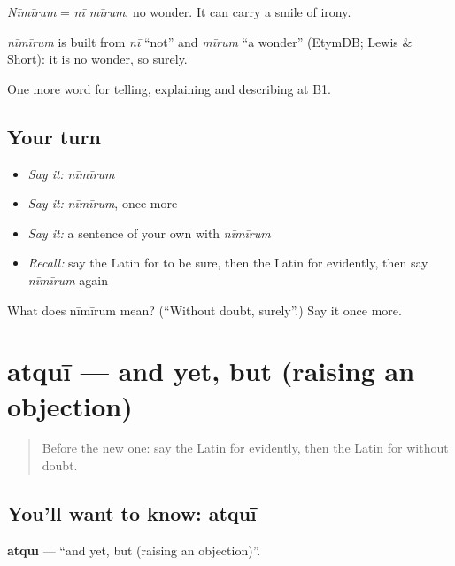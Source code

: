 \emph{Nīmīrum} = \emph{nī mīrum}, no wonder. It can carry a smile of irony.

\begin{cousinweb}
\emph{nīmīrum} is built from \emph{nī} \textquotedblleft{}not\textquotedblright{} and \emph{mīrum} \textquotedblleft{}a wonder\textquotedblright{} (EtymDB; Lewis \& Short): it is no wonder, so surely.
\end{cousinweb}

\begin{grammarlens}[title={What you've built}]
One more word for telling, explaining and describing at B1.
\end{grammarlens}

\subsection*{Your turn}
\begin{itemize}
\raggedright
  \item \emph{Say it:} \emph{nīmīrum}
  \item \emph{Say it:} \emph{nīmīrum}, once more
  \item \emph{Say it:} a sentence of your own with \emph{nīmīrum}
  \item \emph{Recall:} say the Latin for to be sure, then the Latin for evidently, then say \emph{nīmīrum} again
\end{itemize}

\begin{tcolorbox}[breakable,colback=teal!4,colframe=teal!35!black,title={Before you move on}]
What does nīmīrum mean? (\textquotedblleft{}Without doubt, surely\textquotedblright{}.) Say it once more.
\end{tcolorbox}
\section[atquī]{atquī — and yet, but (raising an objection)}

\label{lesson:LA-C366-atqui}



\begin{quote}
Before the new one: say the Latin for evidently, then the Latin for without doubt.
\end{quote}

\subsection*{You'll want to know: atquī}
\textbf{atquī} — \textquotedblleft{}and yet, but (raising an objection)\textquotedblright{}.

